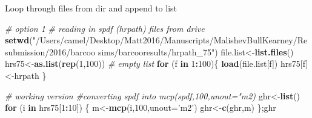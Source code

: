 \documentclass[10,portrait]{article}
\newenvironment{Shaded}{\begin{snugshade}}{\end{snugshade}}
\newcommand{\KeywordTok}[1]{\textcolor[rgb]{0.13,0.29,0.53}{\textbf{#1}}}
\newcommand{\DataTypeTok}[1]{\textcolor[rgb]{0.13,0.29,0.53}{#1}}
\newcommand{\DecValTok}[1]{\textcolor[rgb]{0.00,0.00,0.81}{#1}}
\newcommand{\StringTok}[1]{\textcolor[rgb]{0.31,0.60,0.02}{#1}}
\newcommand{\CommentTok}[1]{\textcolor[rgb]{0.56,0.35,0.01}{\textit{#1}}}
\newcommand{\ControlFlowTok}[1]{\textcolor[rgb]{0.13,0.29,0.53}{\textbf{#1}}}
\newcommand{\OperatorTok}[1]{\textcolor[rgb]{0.81,0.36,0.00}{\textbf{#1}}}
\newcommand{\NormalTok}[1]{#1}
\begin{document}
Loop through files from dir and append to list

\begin{Shaded}
\begin{Highlighting}[]
\CommentTok{# option 1 }
\CommentTok{# reading in spdf (hrpath) files from drive}
\KeywordTok{setwd}\NormalTok{(}\StringTok{"/Users/camel/Desktop/Matt2016/Manuscripts/MalishevBullKearney/Resubmission/2016/barcoo sims/barcooresults/hrpath_75"}\NormalTok{)}
\NormalTok{file.list<-}\KeywordTok{list.files}\NormalTok{()}
\NormalTok{hrs75<-}\KeywordTok{as.list}\NormalTok{(}\KeywordTok{rep}\NormalTok{(}\DecValTok{1}\NormalTok{,}\DecValTok{100}\NormalTok{)) }\CommentTok{# empty list}
\ControlFlowTok{for}\NormalTok{ (f }\ControlFlowTok{in} \DecValTok{1}\OperatorTok{:}\DecValTok{100}\NormalTok{)\{}
  \KeywordTok{load}\NormalTok{(file.list[f])}
\NormalTok{  hrs75[f]<-hrpath}
\NormalTok{\}}

\CommentTok{# working version}
\CommentTok{#converting spdf into mcp(spdf,100,unout="m2)}
\NormalTok{ghr<-}\KeywordTok{list}\NormalTok{()}
\ControlFlowTok{for}\NormalTok{ (i }\ControlFlowTok{in}\NormalTok{ hrs75[}\DecValTok{1}\OperatorTok{:}\DecValTok{10}\NormalTok{]) \{}
\NormalTok{  m<-}\KeywordTok{mcp}\NormalTok{(i,}\DecValTok{100}\NormalTok{,}\DataTypeTok{unout=}\StringTok{'m2'}\NormalTok{)}
\NormalTok{  ghr<-}\KeywordTok{c}\NormalTok{(ghr,m)}
\NormalTok{\};ghr}


\end{Highlighting}
\end{Shaded}
\end{document}
